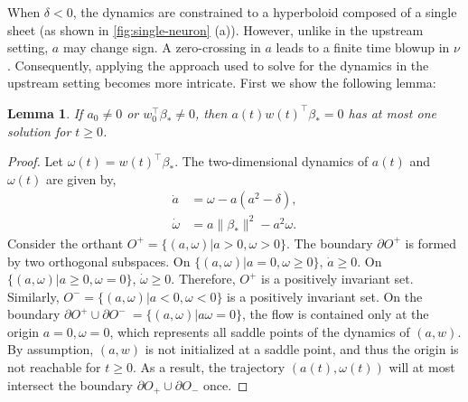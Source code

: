 \documentclass{article}
\theoremstyle{plain}
\newtheorem{lemma}[theorem]{Lemma}
\theoremstyle{definition}
\theoremstyle{remark}
\begin{document}
When $\delta < 0$, the dynamics are constrained to a hyperboloid composed of a single sheet (as shown in \cref{fig:single-neuron} (a)).
%
However, unlike in the upstream setting, $a$ may change sign. %
%
A zero-crossing in $a$ leads to a finite time blowup in $\nu$.
%
Consequently, applying the approach used to solve for the dynamics in the upstream setting becomes more intricate.
%
First we show the following lemma:
%
\begin{lemma} \label{lemma:crossing}
    If $a_0\neq 0$ or $w_0^\intercal \beta_*\neq 0$, then $a(t) w(t)^\intercal \beta_* = 0$ has at most one solution for $t \geq 0$.
\end{lemma}
\begin{proof}
Let $\omega(t)=w(t)^\intercal\beta_*$.
The two-dimensional dynamics of $a(t)$ and $\omega(t)$ are given by,
\begin{align}
    \dot{a} &= \omega - a (a^2-\delta),\\
    \dot{\omega} &= a\|\beta_*\|^2 - a^2  \omega.
\end{align}
Consider the orthant $O^+=\{(a,\omega)|a> 0, \omega>0\}$.
%
The boundary $\partial O^+$ is formed by two orthogonal subspaces.
%
On $\{(a,\omega)|a = 0, \omega\geq 0\}$, $\dot{a} \geq 0$.
%
On $\{(a,\omega)|a \geq 0, \omega = 0\}$, $\dot{\omega} \geq 0$. 
%
Therefore, $O^+$ is a positively invariant set. 
%
Similarly, $O^-=\{(a,\omega)|a < 0, \omega<0\}$ is a positively invariant set. 
%
On the boundary $\partial O^+ \cup \partial O^-\ = \{(a,\omega)|a\omega=0\}$, the flow is contained only at the origin $a=0, \omega=0$, which represents all saddle points of the dynamics of $(a, w)$. 
%
By assumption, $(a, w)$ is not initialized at a saddle point, and thus the origin is not reachable for $t \ge 0$.
%
As a result, the trajectory $(a(t),\omega(t))$ will at most intersect the boundary $\partial O_+ \cup \partial O_-$ once.
\end{proof}
\end{document}
